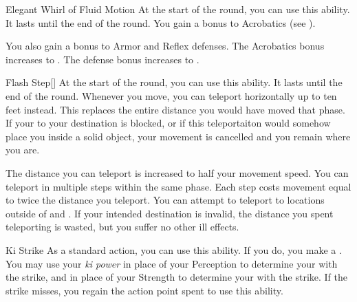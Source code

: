 {            \begin{ability}{Elegant Whirl of Fluid Motion}
                At the start of the round, you can use this ability.
                It lasts until the end of the round.
                You gain a  bonus to Acrobatics (see ).

                \rankline
                 You also gain a  bonus to Armor and Reflex defenses.
                 The Acrobatics bonus increases to .
                 The defense bonus increases to .
            \end{ability}

            \begin{ability}{Flash Step}[]
                At the start of the round, you can use this ability.
                It lasts until the end of the round.
                Whenever you move, you can teleport horizontally up to ten feet instead.
                This replaces the entire distance you would have moved that phase.
                If your  to your destination is blocked, or if this teleportaiton would somehow place you inside a solid object, your movement is cancelled and you remain where you are.

                \rankline
                 The distance you can teleport is increased to half your movement speed.
                 You can teleport in multiple steps within the same phase.
                Each step costs movement equal to twice the distance you teleport.
                 You can attempt to teleport to locations outside of  and .
                If your intended destination is invalid, the distance you spent teleporting is wasted, but you suffer no other ill effects.
            \end{ability}

            \begin{ability}{Ki Strike}
                As a standard action, you can use this ability.
                If you do, you make a .
                You may use your \textit{ki power} in place of your Perception to determine your  with the strike, and in place of your Strength to determine your  with the strike.
                If the strike misses, you regain the action point spent to use this ability.


\end{ability}}
